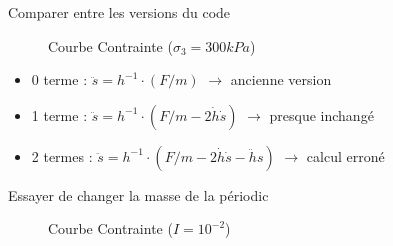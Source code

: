 \documentclass[10pt]{beamer}
\begin{document}
\begin{frame}{Comparer entre les versions du code}
    \begin{figure}[h]
        \centering
        \scalebox{0.5}{}
        \caption{Courbe Contrainte ($\sigma_3 = 300kPa$)}
    \end{figure}
    \begin{itemize}
        \item 0 terme : $\ddot{s} = h^{-1} \cdot (F/m)$ $\rightarrow$ ancienne version
        \item 1 terme : $\ddot{s} = h^{-1} \cdot (F/m - 2 \dot{h} \dot{s})$ $\rightarrow$ presque inchangé
        \item 2 termes : $\ddot{s} = h^{-1} \cdot (F/m - 2 \dot{h} \dot{s} - \ddot{h} s)$ $\rightarrow$ calcul erroné
    \end{itemize}
\end{frame}


\begin{frame}{Essayer de changer la masse de la périodic}
    \begin{figure}[h]
        \centering
        \scalebox{0.5}{}
        \caption{Courbe Contrainte ($I = 10^{-2}$)}
    \end{figure}
\end{frame}
\end{document}
